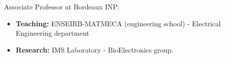 

\begin{cvparagraph}

Associate Professor at Bordeaux INP:
\begin{itemize}
	\item \textbf{Teaching:} ENSEIRB-MATMECA (engineering school) - Electrical Engineering department
	\item \textbf{Research:} IMS Laboratory - BioElectronics group.
\end{itemize}
\end{cvparagraph}